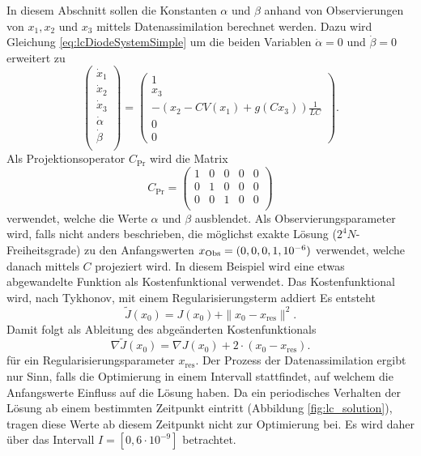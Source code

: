 In diesem Abschnitt sollen die Konstanten $\alpha$ und $\beta$ anhand von Observierungen von $x_1,x_2$ und $x_3$ mittels Datenassimilation berechnet werden. Dazu wird Gleichung \eqref{eq:lcDiodeSystemSimple} um die beiden Variablen $\dot \alpha = 0$ und $\dot \beta = 0$ erweitert zu
\begin{equation}
 \begin{pmatrix}
  \dot x_1\\
  \dot x_2\\
  \dot x_3\\
  \dot \alpha\\
  \dot \beta\\
 \end{pmatrix}
 = 
 \begin{pmatrix}
  1\\
  x_3\\
  -\left(x_2-CV(x_1) + g(Cx_3)\right)\frac{1}{LC}\\
  0\\
  0
 \end{pmatrix}.
 \label{eq:lcDiodeSystemExtended}
\end{equation}
Als Projektionsoperator $C_{\text{Pr}}$ wird die Matrix 
\[C_{\text{Pr}}=
 \begin{pmatrix}
  1 &0 &0 &0 &0  \\
  0 &1 &0 &0 &0  \\
  0 &0 &1 &0 &0  \\
 \end{pmatrix}
\]
verwendet, welche die Werte $\alpha$ und $\beta$ ausblendet. Als Observierungsparameter wird, falls nicht anders beschrieben, die möglichst exakte Lösung ($2^4N$-Freiheitsgrade) zu den Anfangswerten $x_{\text{Obs}} = (0,0,0,1,10^{-6})$ verwendet, welche danach mittels $C$ projeziert wird. In diesem Beispiel wird eine etwas abgewandelte Funktion als Kostenfunktional verwendet. Das Kostenfunktional wird, nach Tykhonov, mit einem Regularisierungsterm addiert Es entsteht
\[
 \tilde J(x_0) = J(x_0) + \|x_0 - x_{\text{res}}\|^2.
\]
Damit folgt als Ableitung des abgeänderten Kostenfunktionals
\[
 \nabla \tilde J(x_0) = \nabla J(x_0) + 2\cdot (x_0 - x_{\text{res}}). 
\]
 für ein Regularisierungsparameter $x_{\text{res}}$. 
Der Prozess der Datenassimilation ergibt nur Sinn, falls die Optimierung in einem Intervall stattfindet, auf welchem die Anfangswerte Einfluss auf die Lösung haben. Da ein periodisches Verhalten der Lösung ab einem bestimmten Zeitpunkt eintritt (Abbildung \ref{fig:lc_solution}), tragen diese Werte ab diesem Zeitpunkt nicht zur Optimierung bei. Es wird daher über das Intervall $I = [0,6\cdot 10^{-9}]$ betrachtet.
 
